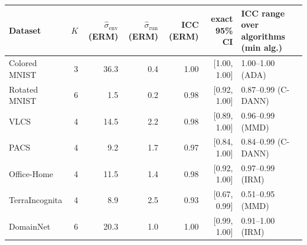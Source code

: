 \begin{tabular}{lrrrrrl}
\toprule
Dataset & $K$ & $\hat\sigma_\text{env}$ (ERM) & $\hat\sigma_\text{run}$ (ERM) & ICC (ERM) & exact 95\% CI & ICC range over algorithms (min alg.) \\
\midrule
Colored MNIST & 3 & 36.3 & 0.4 & 1.00 & [1.00, 1.00] & 1.00--1.00 (ADA) \\
Rotated MNIST & 6 & 1.5 & 0.2 & 0.98 & [0.92, 1.00] & 0.87--0.99 (C-DANN) \\
VLCS & 4 & 14.5 & 2.2 & 0.98 & [0.89, 1.00] & 0.96--0.99 (MMD) \\
PACS & 4 & 9.2 & 1.7 & 0.97 & [0.84, 1.00] & 0.84--0.99 (C-DANN) \\
Office-Home & 4 & 11.5 & 1.4 & 0.98 & [0.92, 1.00] & 0.97--0.99 (IRM) \\
TerraIncognita & 4 & 8.9 & 2.5 & 0.93 & [0.67, 0.99] & 0.51--0.95 (MMD) \\
DomainNet & 6 & 20.3 & 1.0 & 1.00 & [0.99, 1.00] & 0.91--1.00 (IRM) \\
\bottomrule
\end{tabular}
